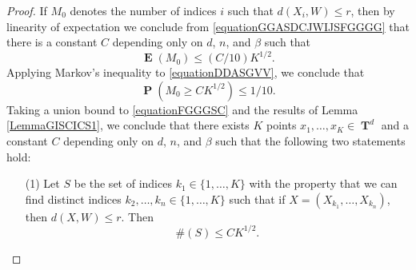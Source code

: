 \documentclass[12pt,reqno]{article}
\numberwithin{equation}{section}
\DeclareMathOperator{\TT}{\mathbf{T}}
\numberwithin{theorem}{section}
\DeclareMathOperator{\EE}{\mathbf{E}}
\DeclareMathOperator{\PP}{\mathbf{P}}
\begin{document}
\begin{proof}
    If $M_0$ denotes the number of indices $i$ such that $d(X_i,W) \leq r$, then by linearity of expectation we conclude from \eqref{equationGGASDCJWIJSFGGGG} that there is a constant $C$ depending only on $d$, $n$, and $\beta$ such that
    \begin{equation} \label{equationDDASGVV}
        \EE(M_0) \leq (C/10) K^{1/2}.
    \end{equation}
    Applying Markov's inequality to \eqref{equationDDASGVV}, we conclude that
    \begin{equation} \label{equationFGGGSC}
        \PP(M_0 \geq C K^{1/2}) \leq 1/10.
    \end{equation}
    Taking a union bound to \eqref{equationFGGGSC} %
    and the results of Lemma \ref{LemmaGISCICS1}, we conclude that there exists $K$ points $x_1, \dots, x_K \in \TT^d$ and a constant $C$ depending only on $d$, $n$, and $\beta$ such that the following two statements hold:
    \begin{itemize}
        \item[(1)] Let $S$ be the set of indices $k_1 \in \{ 1, \dots, K \}$ with the property that we can find distinct indices $k_2, \dots, k_n \in \{ 1, \dots, K \}$ such that if $X = (X_{k_1}, \dots, X_{k_n})$, then $d(X, W) \leq r$. Then
        \begin{equation} \label{equationGGSC99124}
            \#(S) \leq C K^{1/2}.
        \end{equation}


\end{itemize}
\end{proof}
\end{document}
